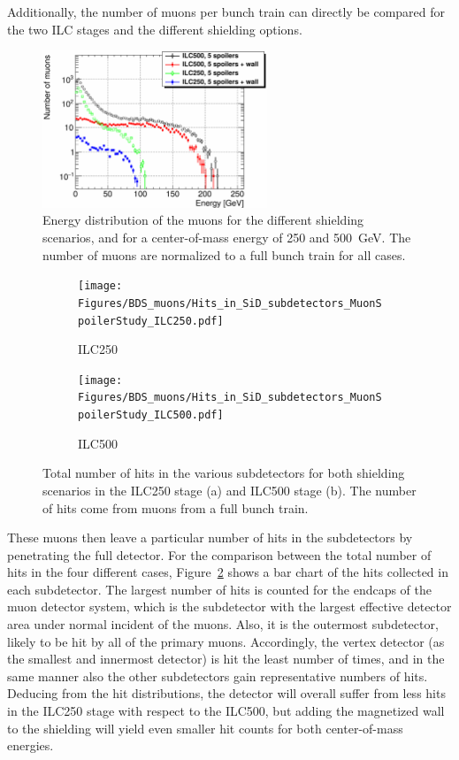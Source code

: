 Additionally, the number of muons per bunch train can directly be compared for the two ILC stages and the different shielding options.
\begin{figure}[htbp]
\centering
\includegraphics[width=0.6\textwidth]{Figures/BDS_muons/Energy_Comparison_ILC500vsILC250.pdf}
\caption[Muon energy]{Energy distribution of the muons for the different shielding scenarios, and for a center-of-mass energy of 250 and \SI{500}{\GeV}.
The number of muons are normalized to a full bunch train for all cases.}
\label{fig:BDS_Muons:energy}
\end{figure}

\begin{figure}[!h]
\centering
\begin{subfigure}[t]{0.49\textwidth}
\centering
 \texttt{[image: Figures/BDS\_muons/Hits\_in\_SiD\_subdetectors\_MuonSpoilerStudy\_ILC250.pdf]}
 \caption{ILC250}
\end{subfigure}
\begin{subfigure}[t]{0.49\textwidth}
\centering
 \texttt{[image: Figures/BDS\_muons/Hits\_in\_SiD\_subdetectors\_MuonSpoilerStudy\_ILC500.pdf]}
  \caption{ILC500}
\end{subfigure}
\caption[Number of muon hits in the \sid subdetectors]{Total number of hits in the various \sid subdetectors for both shielding scenarios in the ILC250 stage (a) and ILC500 stage (b).
The number of hits come from muons from a full bunch train.}
\label{fig:BDS_Muons:hits}
\end{figure}

These muons then leave a particular number of hits in the \sid subdetectors by penetrating the full detector.
For the comparison between the total number of hits in the four different cases, Figure~\ref{fig:BDS_Muons:hits} shows a bar chart of the hits collected in each subdetector.
The largest number of hits is counted for the endcaps of the muon detector system, which is the subdetector with the largest effective detector area under normal incident of the muons.
Also, it is the outermost subdetector, likely to be hit by all of the primary muons.
Accordingly, the vertex detector (as the smallest and innermost detector) is hit the least number of times, and in the same manner also the other subdetectors gain representative numbers of hits.
Deducing from the hit distributions, the \sid detector will overall suffer from less hits in the ILC250 stage with respect to the ILC500, but adding the magnetized wall to the shielding will yield even smaller hit counts for both center-of-mass energies.

